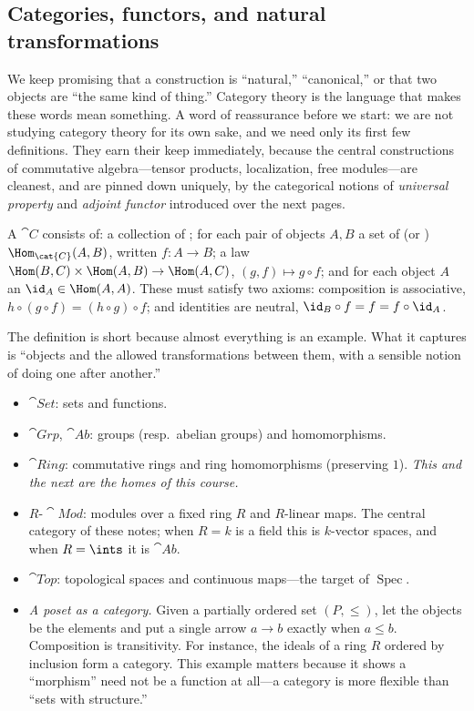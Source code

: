 \documentclass[11pt]{article}
\DeclareMathOperator{\Spec}{Spec}
\begin{document}
\subsection{Categories, functors, and natural transformations}

We keep promising that a construction is ``natural,'' ``canonical,'' or that two objects are
``the same kind of thing.'' Category theory is the language that makes these words mean
something. A word of reassurance before we start: we are not studying category theory for
its own sake, and we need only its first few definitions. They earn their keep immediately,
because the central constructions of commutative algebra---tensor products, localization,
free modules---are cleanest, and are pinned down uniquely, by the categorical notions of
\emph{universal property} and \emph{adjoint functor} introduced over the next pages.

\begin{ddefinition}[Category]
A  $\cat{C}$ consists of: a collection of ; for each pair of
objects $A,B$ a set of  (or ) $\Hom_{\cat{C}}(A,B)$, written
$f\colon A\to B$; a  law $\Hom(B,C)\times\Hom(A,B)\to\Hom(A,C)$,
$(g,f)\mapsto g\circ f$; and for each object $A$ an  $\id_A\in\Hom(A,A)$.
These must satisfy two axioms: composition is associative, $h\circ(g\circ f)=(h\circ g)\circ
f$; and identities are neutral, $\id_B\circ f = f = f\circ\id_A$.
\end{ddefinition}

The definition is short because almost everything is an example. What it captures is
``objects and the allowed transformations between them, with a sensible notion of doing one
after another.''

\begin{eexample}
\begin{itemize}\setlength{\itemsep}{2pt}
\item $\cat{Set}$: sets and functions.
\item $\cat{Grp}$, $\cat{Ab}$: groups (resp.\ abelian groups) and homomorphisms.
\item $\cat{Ring}$: commutative rings and ring homomorphisms (preserving $1$). \emph{This and
the next are the homes of this course.}
\item $R\text{-}\cat{Mod}$: modules over a fixed ring $R$ and $R$-linear maps. The central
category of these notes; when $R=k$ is a field this is $k$-vector spaces, and when
$R=\ints$ it is $\cat{Ab}$.
\item $\cat{Top}$: topological spaces and continuous maps---the target of $\Spec$.
\item \emph{A poset as a category.} Given a partially ordered set $(P,\le)$, let the objects
be the elements and put a single arrow $a\to b$ exactly when $a\le b$. Composition is
transitivity. For instance, the ideals of a ring $R$ ordered by inclusion form a category.
This example matters because it shows a ``morphism'' need not be a function at all---a
category is more flexible than ``sets with structure.''
\end{itemize}
\end{eexample}
\end{document}
